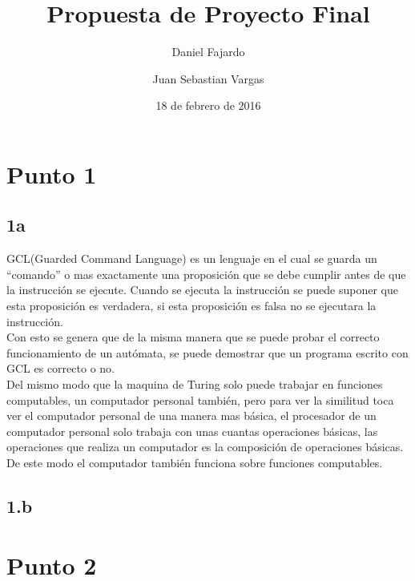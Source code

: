 \documentclass[aps,prl,reprint,rmp]{revtex4-1}
\begin{document}
\title{Propuesta de Proyecto Final}

\author{Daniel Fajardo}
\author{Juan Sebastian Vargas}
 

\date{18 de febrero de 2016}

\setlength{\columnsep}{1cm}






\maketitle



\section{Punto 1}


\subsection{1a}
GCL(Guarded Command Language) es un lenguaje en el cual se guarda un “comando” o mas exactamente una proposición que se debe cumplir antes de que la instrucción se ejecute. Cuando se ejecuta la instrucción se puede suponer que esta proposición es verdadera, si esta proposición es falsa no se ejecutara la instrucción.\\

Con esto se genera que de la misma manera que se puede probar el correcto funcionamiento de un autómata, se puede demostrar que un programa escrito con GCL es correcto o no.\\ 

Del mismo modo que la maquina de Turing solo puede trabajar en funciones computables, un computador personal también, pero para ver la similitud toca ver el computador personal de una manera mas básica, el procesador de un computador personal solo trabaja con unas cuantas operaciones básicas, las operaciones que realiza un computador es la composición de operaciones básicas. De este modo el computador también funciona sobre funciones computables.




 
\subsection{1.b}
\section{Punto 2}
\end{document}
